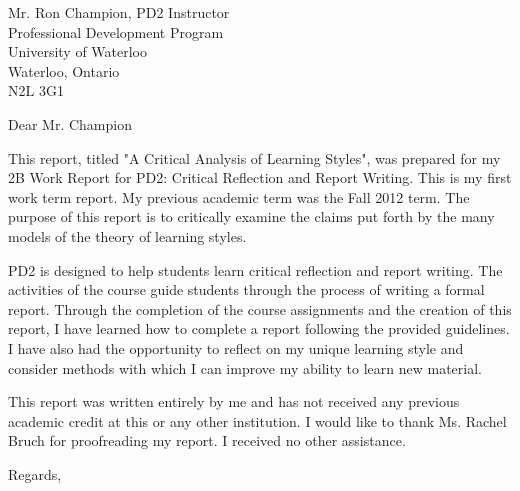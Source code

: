 \documentclass[12pt]{letter}
\begin{document}
\begin{letter}
{Mr. Ron Champion, PD2 Instructor\\
Professional Development Program\\
University of Waterloo\\
Waterloo, Ontario\\
N2L 3G1}

\opening{Dear Mr. Champion}

This report, titled "A Critical Analysis of Learning Styles", was prepared
for my 2B Work Report for PD2: Critical Reflection and Report Writing. This is
my first work term report. My previous academic term was the Fall 2012 term. The
purpose of this report is to critically examine the claims put forth by the many
models of the theory of learning styles.

PD2 is designed to help students learn critical reflection and report writing.
The activities of the course guide students through the process of writing a
formal report. Through the completion of the course assignments and the creation
of this report, I have learned how to complete a report following the provided
guidelines. I have also had the opportunity to reflect on my unique learning
style and consider methods with which I can improve my ability to learn new
material.

This report was written entirely by me and has not received any previous
academic credit at this or any other institution. I would like to thank Ms.
Rachel Bruch for proofreading my report. I received no other assistance.

\closing{Regards,}
\end{letter}
\end{document}
